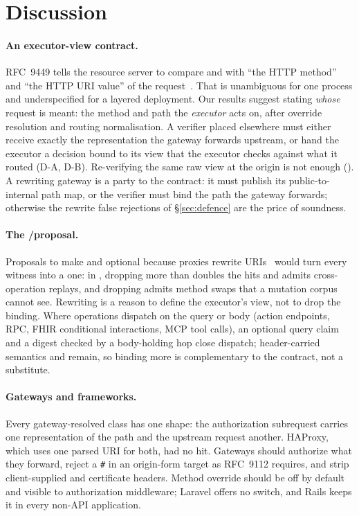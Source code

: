\section{Discussion}\label{sec:discussion}

\paragraph{An executor-view contract.}\label{sec:discussion:rec} RFC~9449 tells
the resource server to compare \htm and \htu with ``the HTTP method'' and ``the
HTTP URI value'' of the request~\cite{rfc9449}. That is unambiguous for one
process and underspecified for a layered deployment. Our results suggest
stating \emph{whose} request is meant: the method and path the
\emph{executor} acts on, after override resolution and routing
normalisation. A verifier placed elsewhere must either receive exactly the
representation the gateway forwards upstream, or hand the executor a decision
bound to its view that the executor checks against what it routed (D-A, D-B).
Re-verifying the same raw view at the origin is not enough (). A
rewriting gateway is a party to the contract: it must publish its
public-to-internal path map, or the verifier must bind the path the gateway
forwards; otherwise the \FRRAllDAB{} rewrite false rejections of
\S\ref{sec:defence} are the price of soundness.

\paragraph{The \htm/\htu proposal.} Proposals to make \htm and \htu optional
because proxies rewrite URIs~\cite{allam2026thread,madden2025thread} would turn
every \GB witness into a \GA one: in , dropping \htu more than doubles
the hits and admits \AblOneSwapNoHtu{} cross-operation replays, and dropping
\htm admits \AblOneSwapNoHtm{} method swaps that a mutation corpus cannot see.
Rewriting is a reason to define the executor's view, not to drop the binding.
Where operations dispatch on the query or body (action endpoints, RPC, FHIR
conditional interactions, MCP tool calls), an optional query claim and a
digest checked by a body-holding hop close \GA dispatch; header-carried
semantics and \GB remain, so binding more is complementary to the contract,
not a substitute.

\paragraph{Gateways and frameworks.} Every gateway-resolved class has one
shape: the authorization subrequest carries one representation of the path and
the upstream request another. HAProxy, which uses one parsed URI for both, had
no \GB hit. Gateways should authorize what they forward, reject a \texttt{\#}
in an origin-form target as RFC~9112 requires, and strip client-supplied
 and certificate headers. Method override should be off by
default and visible to authorization middleware; Laravel offers no switch, and
Rails keeps it in every non-API application.

